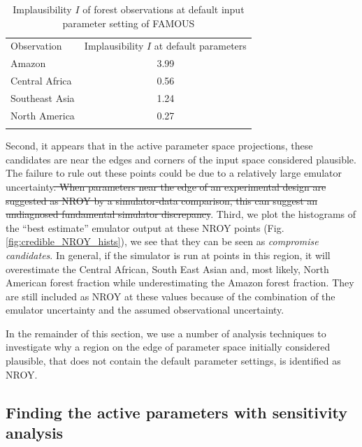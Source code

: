\documentclass[esd, article]{copernicus} %
\providecommand{\DIFadd}[1]{{\protect\color{blue}\uwave{#1}}} %
\providecommand{\DIFdel}[1]{{\protect\color{red}\sout{#1}}}                      %
\providecommand{\DIFaddbegin}{} %
\providecommand{\DIFaddend}{} %
\providecommand{\DIFdelbegin}{} %
\providecommand{\DIFdelend}{} %
\begin{document}
\begin{table}[t]
\caption{Implausibility $I$ of forest observations at default input parameter setting of FAMOUS}\label{tab:default_parameter_implausibility}
\begin{tabular}{lc}

\tophline
Observation &  Implausibility $I$ at default parameters \\
Amazon & 3.99 \\
Central Africa & 0.56 \\
Southeast Asia & 1.24 \\
North America & 0.27 \\
\bottomhline
\end{tabular}
\belowtable{} %
\end{table}

Second, it appears that in the active parameter space projections, these candidates are near the edges and corners of the input space considered plausible. The failure to rule out these points could be due to a relatively large emulator uncertainty\DIFdelbegin \DIFdel{. When parameters near the edge of an experimental design are suggested as NROY by a simulator-data comparison, this can suggest an undiagnosed fundamental simulator discrepancy}\DIFdelend \DIFaddbegin \DIFadd{, for example}\DIFaddend . Third, we plot the histograms of the ``best estimate'' emulator output at these NROY points (Fig.  \ref{fig:credible_NROY_hists}), we see that they can be seen as \emph{compromise candidates}. In general, if the simulator is run at points in this region, it will overestimate the Central African, South East Asian and, most likely, North American forest fraction while underestimating the Amazon forest fraction. They are still included as NROY at these values because of the combination of the emulator uncertainty and the assumed observational uncertainty.


In the remainder of this section, we use a number of analysis techniques to investigate why a region on the edge of parameter space initially considered plausible, that does not contain the default parameter settings, is identified as NROY.

\subsection{Finding the active parameters with sensitivity analysis}\label{ssec:sensitivity}
\end{document}
